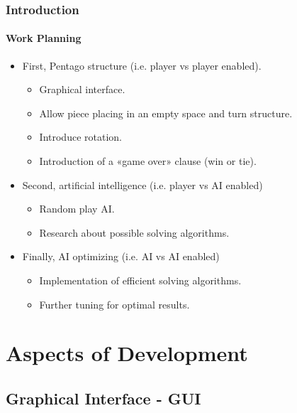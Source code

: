 \documentclass[10pt]{beamer}
\begin{document}
\begin{frame}
\frametitle{Introduction}
\framesubtitle{Work Planning}

	\begin{itemize}
	  
		\item First, Pentago structure (i.e. player vs player enabled).
		
			\begin{itemize}
			  \item Graphical interface.
			  \item Allow piece placing in an empty space and turn structure.
			  \item Introduce rotation.
			  \item Introduction of a «game over» clause (win or tie).		  		 
			\end{itemize}
			
		\item Second, artificial intelligence (i.e. player vs AI enabled)
		
			\begin{itemize}
			  
			  \item Random play AI.

			  \item Research about possible solving algorithms.
			  
			\end{itemize}
		
		\item Finally, AI optimizing (i.e. AI vs AI enabled)
		
			\begin{itemize}
			  
			  \item Implementation of efficient solving algorithms.
			  \item Further tuning for optimal results.
			  
			\end{itemize}
		
	\end{itemize}
\end{frame}

\section{Aspects of Development}
\subsection{Graphical Interface - GUI}
\end{document}
